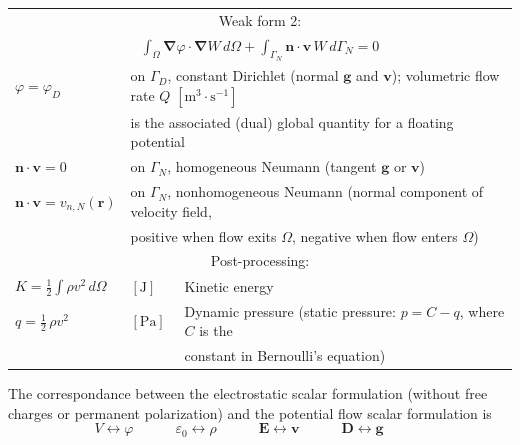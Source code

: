 \documentclass[letterpaper]{article}
\newcommand{\vect}[1]{\mathbf#1}
\newcommand{\nab}{\vect{\nabla}}
\begin{document}
\begin{table}[h!]
\begin{tabular}{lll}
 \hline

\multicolumn{3}{c}{Weak form 2:} \\[1pt]
\multicolumn{3}{c}{$\displaystyle\int_\Omega \nab \varphi\cdot\nab W\,d\Omega+
\int_{\Gamma_N}\vect{n}\cdot\vect{v}\,W\,d{\Gamma_N}=0$}\\[8pt]
  $\varphi=\varphi_D$ & \multicolumn{2}{l}{on $\Gamma_D$, constant Dirichlet (normal $\vect{g}$ and $\vect{v}$); volumetric flow rate $Q$ $[\text{m}^{3}\cdot \text{s}^{-1}]$}\\
 & \multicolumn{2}{l}{is the associated (dual) global quantity for a floating potential}\\
$\vect{n}\cdot\vect{v}=0$ & \multicolumn{2}{l}{on $\Gamma_N$, homogeneous Neumann (tangent $\vect{g}$ or $\vect{v}$)}\\
$\vect{n}\cdot\vect{v}=v_{n,N}(\vect{r})$ & \multicolumn{2}{l}{on $\Gamma_N$, nonhomogeneous Neumann (normal component of velocity field,}\\
 & \multicolumn{2}{l}{positive when flow exits $\Omega$, negative when flow enters $\Omega$)}\\
 
 \hline
 \multicolumn{3}{c}{Post-processing:} \\
 $K=\frac{1}{2}\!\int\rho v^2\,d\Omega$ & $[\text{J}]$ & Kinetic energy\\[1pt]
  $q=\frac{1}{2}\,\rho v^2$ & $[\text{Pa}%
  ]$ & Dynamic pressure (static pressure: $p=C-q$, where $C$ is the\\
 & & constant in Bernoulli's equation)\\
\hline
\end{tabular}
\end{table}

The correspondance between the electrostatic scalar formulation (without free charges or permanent polarization) and the potential flow scalar formulation is  
\begin{equation}
V\leftrightarrow \varphi\qquad\quad
\varepsilon_0\leftrightarrow \rho \qquad\quad
\vect{E}\leftrightarrow\vect{v}\qquad\quad
\vect{D}\leftrightarrow\vect{g}\qquad\quad
\end{equation}





\clearpage
\end{document}
